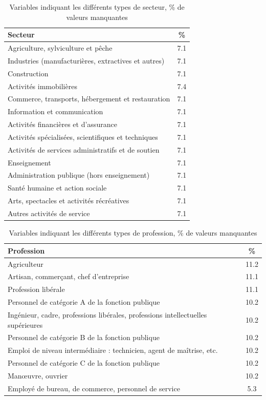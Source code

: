 \documentclass[12pt, a4paper, titlepage, table]{article}
\begin{document}
\begin{table}[H]
	\centering
	\begin{tabularx}{\textwidth}{|X|c|}
		\hline
		\textbf{Secteur} & \textbf{\%} \\
		\hline
		Agriculture, sylviculture et pêche & 7.1 \\
		\hline
		Industries (manufacturières, extractives et autres) & 7.1 \\
		\hline
		Construction & 7.1 \\
		\hline
		Activités immobilières & 7.4 \\
		\hline
		Commerce, transports, hébergement et restauration & 7.1 \\
		\hline
		Information et communication & 7.1 \\
		\hline
		Activités financières et d’assurance & 7.1 \\
		\hline
		Activités spécialisées, scientifiques et techniques & 7.1 \\
		\hline
		Activités de services administratifs et de soutien & 7.1 \\
		\hline
		Enseignement & 7.1 \\
		\hline
		Administration publique (hors enseignement) & 7.1 \\
		\hline
		Santé humaine et action sociale & 7.1 \\
		\hline
		Arts, spectacles et activités récréatives & 7.1 \\
		\hline
		Autres activités de service & 7.1 \\
		\hline
	\end{tabularx}
	\caption{Variables indiquant les différents types de secteur, \% de valeurs manquantes}
	\label{tab:secteurs}
\end{table}

\begin{table}[H]
	\centering
	\begin{tabularx}{\textwidth}{|X|c|}
		\hline
		\textbf{Profession} & \textbf{\%} \\
		\hline
		Agriculteur & 11.2 \\
		\hline
		Artisan, commerçant, chef d'entreprise & 11.1 \\
		\hline
		Profession libérale & 11.1 \\
		\hline
		Personnel de catégorie A de la fonction publique & 10.2 \\
		\hline
		Ingénieur, cadre, professions libérales, professions intellectuelles supérieures & 10.2 \\
		\hline
		Personnel de catégorie B de la fonction publique & 10.2 \\
		\hline
		Emploi de niveau intermédiaire : technicien, agent de maîtrise, etc. & 10.2 \\
		\hline
		Personnel de catégorie C de la fonction publique & 10.2 \\
		\hline
		Manœuvre, ouvrier & 10.2 \\
		\hline
		Employé de bureau, de commerce, personnel de service & 5.3 \\
		\hline
	\end{tabularx}
	\caption{Variables indiquant les différents types de profession, \% de valeurs manquantes}
	\label{tab:professions}
\end{table}
\end{document}
